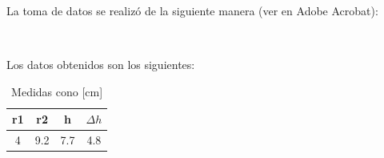 La toma de datos se realizó de la siguiente manera (ver en Adobe Acrobat):

\begin{center}
    \\
\end{center}

\newpage
Los datos obtenidos son los siguientes:

\begin{table}[H]
    \centering
    \caption{Medidas cono [cm]}
    \begin{tabular}{|c|c|c|c|}
    \hline
    r1 & r2 & h & $\Delta h$ \\ \hline
    4 & 9.2 & 7.7 & 4.8 \\ \hline
    \end{tabular}\\
    \label{tab:permeabilidad}
\end{table}

